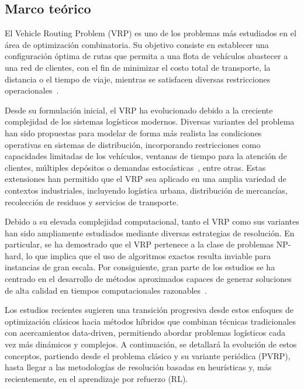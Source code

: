 \label{sec:lol}
\subsection{Marco teórico}
El Vehicle Routing Problem (VRP) es uno de los problemas más estudiados en el área de optimización combinatoria. Su objetivo consiste en establecer una configuración óptima de rutas que permita a una flota de vehículos abastecer a una red de clientes, con el fin de minimizar el costo total de transporte, la distancia o el tiempo de viaje, mientras se satisfacen diversas restricciones operacionales~\cite{EKSIOGLU20091472}.

Desde su formulación inicial, el VRP ha evolucionado debido a la creciente complejidad de los sistemas logísticos modernos. Diversas variantes del problema han sido propuestas para modelar de forma más realista las condiciones operativas en sistemas de distribución, incorporando restricciones como capacidades limitadas de los vehículos, ventanas de tiempo para la atención de clientes, múltiples depósitos o demandas estocásticas~\cite{EKSIOGLU20091472}, entre otras. Estas extensiones han permitido que el VRP sea aplicado en una amplia variedad de contextos industriales, incluyendo logística urbana, distribución de mercancías, recolección de residuos y servicios de transporte.

Debido a su elevada complejidad computacional, tanto el VRP como sus variantes han sido ampliamente estudiados mediante diversas estrategias de resolución. En particular, se ha demostrado que el VRP pertenece a la clase de problemas NP-hard, lo que implica que el uso de algoritmos exactos resulta inviable para instancias de gran escala. Por consiguiente, gran parte de los estudios se ha centrado en el desarrollo de métodos aproximados capaces de generar soluciones de alta calidad en tiempos computacionales razonables~\cite{EKSIOGLU20091472}.

Los estudios recientes sugieren una transición progresiva desde estos enfoques de optimización clásicos hacia métodos híbridos que combinan técnicas tradicionales con acercamientos data-driven, permitiendo abordar problemas logísticos cada vez más dinámicos y complejos. A continuación, se detallará la evolución de estos conceptos, partiendo desde el problema clásico y su variante periódica (PVRP), hasta llegar a las metodologías de resolución basadas en heurísticas y, más recientemente, en el aprendizaje por refuerzo (RL).

